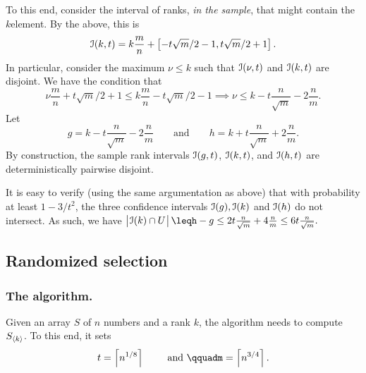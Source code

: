 To this end, consider the interval of ranks, \emph{in the sample},
that might contain the $k$\th element. By the above, this is
\begin{equation*}
  \IntervalA(k, t)%
  =%
  k \frac{m}{n} + \pbrc[]{ -t \sqrt{m}/2 -1, t
  \sqrt{m}/2 +1}.
\end{equation*}
In particular, consider the maximum $\nu\leq k$ such that
$\EuScript{I}(\nu, t)$ and $\EuScript{I}(k, t)$ are disjoint. We have the
condition that
\begin{equation*}
    \nu \frac{m}{n}  +t
    \sqrt{m}/2 +1 \leq k \frac{m}{n} -t\sqrt{m}/2 -1%
    \implies%
    \nu  \leq k  - t \frac{n}{\sqrt{m}} -2\frac{n}{m}.
\end{equation*}
Let
\begin{equation*}
    g= k - t \frac{n}{\sqrt{m}} -2\frac{n}{m}
    \qquad\text{and}\qquad
    h = k + t \frac{n}{\sqrt{m}} +2\frac{n}{m}.
\end{equation*}
By construction, the sample rank intervals $\EuScript{I}(g, t)$,
$\EuScript{I}(k, t)$, and $\EuScript{I}(h, t)$ are deterministically pairwise
disjoint.

It is easy to verify (using the same argumentation as above) that with
probability at least $1-3/t^2$, the three confidence intervals
$\EuScript{I}(g), \EuScript{I}(k)$ and $\EuScript{I}(h)$ do not intersect. As
such, we have
\begin{math}
    \cardin{\big.\ts \Interval(k) \cap U\ts}%
    \leq%
    h-g%
    \leq%
    2 t \frac{n}{\sqrt{m}} + 4 \frac{n}{m} \leq 6 t \frac{n}{\sqrt{m}}.
\end{math}










\subsection{Randomized selection}

\subsubsection{The algorithm.}
Given an array $S$ of $n$ numbers and a rank $k$, the algorithm needs to
compute $S_{\langle k\rangle}$. To this end, it sets
\begin{equation*}
    t= \ceil{n^{1/8}}
    \qquad\text{ and }\qquad%
    m = \ceil{n^{3/4}}.
\end{equation*}

